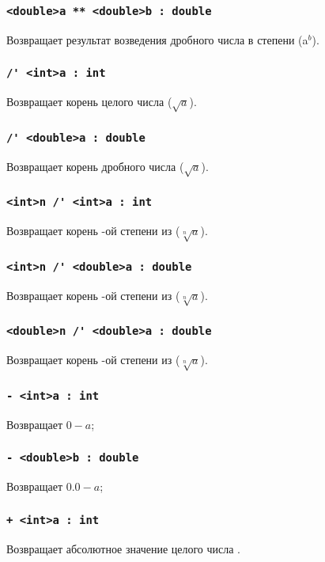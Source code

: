 \documentclass[a4paper, 14pt]{extarticle}
\begin{document}
\subsubsection{\lstinline`<double>a ** <double>b : double`}
	Возвращает результат возведения дробного числа  в степени  (a$^b$).

\subsubsection{\lstinline`/' <int>a : int`}
	Возвращает корень целого числа  ($\sqrt{a}$).

\subsubsection{\lstinline`/' <double>a : double`}
	Возвращает корень дробного числа  ($\sqrt{a}$).

\subsubsection{\lstinline`<int>n /' <int>a : int`}
	Возвращает корень -ой степени из  ($\sqrt[n]{a}$).

\subsubsection{\lstinline`<int>n /' <double>a : double`}
	Возвращает корень -ой степени из  ($\sqrt[n]{a}$).

\subsubsection{\lstinline`<double>n /' <double>a : double`}
	Возвращает корень -ой степени из  ($\sqrt[n]{a}$).


\subsubsection{\lstinline`- <int>a : int`}
	Возвращает $0-a$;

\subsubsection{\lstinline`- <double>b : double`}
	Возвращает $0.0-a$;

\subsubsection{\lstinline`+ <int>a : int`}
	Возвращает абсолютное значение целого числа .
\end{document}
